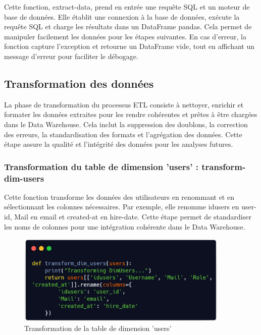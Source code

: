 Cette fonction, extract-data, prend en entrée une requête SQL et un moteur de base de données. Elle établit une connexion à la base de données, exécute la requête SQL et charge les résultats dans un DataFrame pandas.
Cela permet de manipuler facilement les données pour les étapes suivantes. En cas d'erreur, la fonction capture l'exception et retourne un DataFrame vide, tout en affichant un message d'erreur pour faciliter le débogage.

\subsection{Transformation des données}
La phase de transformation du processus ETL consiste à nettoyer, enrichir et formater les données extraites pour les rendre cohérentes et prêtes à être chargées dans le Data Warehouse. Cela inclut la suppression des doublons, la correction des erreurs, la standardisation des formats et l'agrégation des données. Cette étape assure la qualité et l'intégrité des données pour les analyses futures.\\

\subsubsection{Transformation du table de dimension 'users' : transform-dim-users}
Cette fonction transforme les données des utilisateurs en renommant et en sélectionnant les colonnes nécessaires. Par exemple, elle renomme idusers en user-id, Mail en email et created-at en hire-date. Cette étape permet de standardiser les noms de colonnes pour une intégration cohérente dans le Data Warehouse.
\newpage
\begin{figure}[h!]

    \centering
    \includegraphics[width=0.9\textwidth]{chap6.images/trans users.png}
    \caption{ Transformation de la table de dimension 'users' }

\end{figure}

